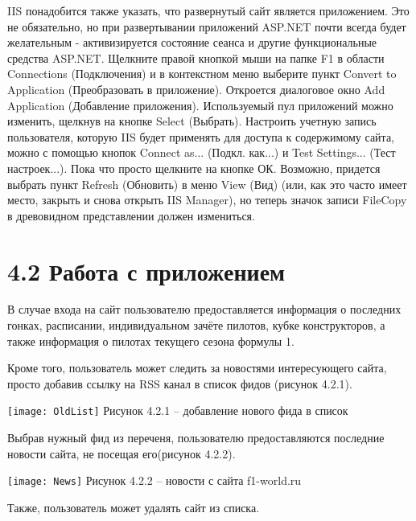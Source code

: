 \documentclass[14pt,a4paper]{extreport}
\begin{document}
\hspace{4ex}IIS понадобится также указать, что развернутый сайт является приложением. Это не обязательно, но при развертывании приложений ASP.NET почти всегда будет желательным - активизируется состояние сеанса и другие функциональные средства ASP.NET. Щелкните правой кнопкой мыши на папке F1 в области Connections (Подключения) и в контекстном меню выберите пункт Convert to Application (Преобразовать в приложение). Откроется диалоговое окно Add Application (Добавление приложения). Используемый пул приложений можно изменить, щелкнув на кнопке Select (Выбрать). Настроить учетную запись пользователя, которую IIS будет применять для доступа к содержимому сайта, можно с помощью кнопок Connect as... (Подкл. как...) и Test Settings... (Тест настроек...). Пока что просто щелкните на кнопке ОК. Возможно, придется выбрать пункт Refresh (Обновить) в меню View (Вид) (или, как это часто имеет место, закрыть и снова открыть IIS Manager), но теперь значок записи FileCopy в древовидном представлении должен измениться.\par
 	\section*{\normalsize\hspace{4ex}4.2 Работа с приложением}
\flushleft\hspace{4ex}В случае входа на сайт пользователю предоставляется информация о последних гонках, расписании, индивидуальном зачёте пилотов, кубке конструкторов, а также информация о пилотах текущего сезона формулы 1.\par
Кроме того, пользователь может следить за новостями интересующего сайта, просто добавив ссылку на RSS канал в список фидов (рисунок 4.2.1). \par
	\center\texttt{[image: OldList]}   
           \center Рисунок 4.2.1 – добавление нового фида в список\par
\flushleft\hspace{4ex}Выбрав нужный фид из переченя, пользователю предоставляются последние новости сайта, не посещая его(рисунок 4.2.2).\par
	\center\texttt{[image: News]}   
           \center Рисунок 4.2.2 –  новости с сайта f1-world.ru\par
\flushleft\hspace{4ex}Также, пользователь может удалять сайт из списка.\par
	\newpage
\end{document}
